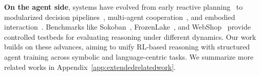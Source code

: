 \textbf{On the agent side}, systems have evolved from early reactive planning~\citep{yao2022react, xu2023rewoo} to modularized decision pipelines~\citep{liu2023llm+, wu2023autogen}, multi-agent cooperation~\citep{li2023camel, wang2024rethinking}, and embodied interaction~\citep{lin2024advancesembodiednavigationusing, li2025embodiedagentinterfacebenchmarking}. Benchmarks like Sokoban~\citep{sokoban}, FrozenLake~\citep{frozenlake}, and WebShop~\citep{yao2022webshop} provide controlled testbeds for evaluating reasoning under different dynamics. Our work builds on these advances, aiming to unify RL-based reasoning with structured agent training across symbolic and language-centric tasks. We summarize more related works in Appendix~\ref{app:extendedrelatedwork}.
\vspace{-5pt}





